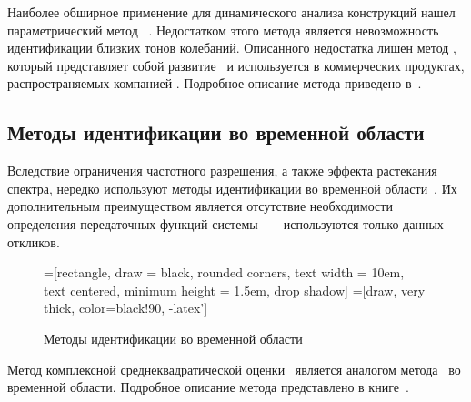 Наиболее обширное применение для динамического анализа конструкций нашел параметрический метод~ \cite{lib:oma:Guillaume}. Недостатком этого метода является невозможность идентификации близких тонов колебаний. Описанного недостатка лишен метод , который представляет собой развитие~ и используется в коммерческих продуктах, распространяемых компанией . Подробное описание метода приведено в~\cite{lib:oma:Peeters&Auweraer}.

\subsection{Методы идентификации во временной области}

Вследствие ограничения частотного разрешения, а также эффекта растекания спектра, нередко используют методы идентификации во временной области~. Их дополнительным преимуществом является отсутствие необходимости определения передаточных функций системы~---~используются только данных откликов.

\begin{figure}[!htb]
	\centering
	=[rectangle, draw = black, rounded corners, text width = 10em, text centered, minimum height = 1.5em, drop shadow]
	=[draw, very thick, color=black!90, -latex']
	\caption{Методы идентификации во временной области~\cite{lib:oma:Nilsson}}\label{fig:schemeTimeDomainOMA}
\end{figure}

Метод комплексной среднеквадратической оценки~ является аналогом метода~ во временной области. Подробное описание метода представлено в книге~\cite{lib:oma:Rainieri}.

